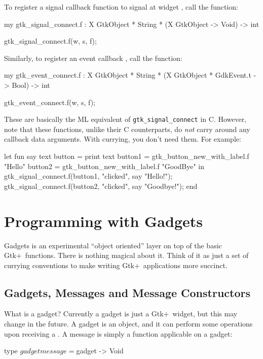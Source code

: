 \documentclass{article}
\newcommand{\gtk}{\mbox{\sf Gtk+}}
\begin{document}
To register a signal callback  function to signal 
at widget , call the function:
\begin{smldisp}
   my gtk_signal_connect.f : 
         X GtkObject * String * (X GtkObject -> Void) -> int

   gtk_signal_connect.f(w, s, f);
\end{smldisp}

Similarly, to register an event callback , call the function:
\begin{smldisp}
   my gtk_event_connect.f : 
         X GtkObject * String * (X GtkObject * GdkEvent.t -> Bool) -> int

   gtk_event_connect.f(w, s, f);
\end{smldisp}

These are basically the ML equivalent of \verb|gtk_signal_connect| in C.
However, note that these functions, unlike their C counterparts, 
do {\em not} carry around any callback data arguments.  
With currying, you don't need them.  For example: 
\begin{smldisp}
 let
     fun say text button = print text 
     button1 = gtk_button_new_with_label.f "Hello"
     button2 = gtk_button_new_with_label.f "GoodBye"
 in 
     gtk_signal_connect.f(button1, "clicked", say "Hello!");
     gtk_signal_connect.f(button2, "clicked", say "Goodbye!");
 end
\end{smldisp}


\section{Programming with Gadgets}\label{sec:gadgets}

Gadgets is an experimental 
``object oriented'' layer on top of the basic \gtk\ functions.
There is nothing magical about it.
Think of it as just a set of currying conventions
to make writing \gtk\ applications more succinct.

\subsection{Gadgets, Messages and Message Constructors}

What is a gadget?
Currently a gadget is just a \gtk\ widget, but this may change in the future.
A gadget is an object, and it can perform some operations 
upon receiving a . 
A message is simply a function applicable on a gadget:
\begin{smldisp}
   type $gadget message = $gadget -> Void
\end{smldisp}
\end{document}
